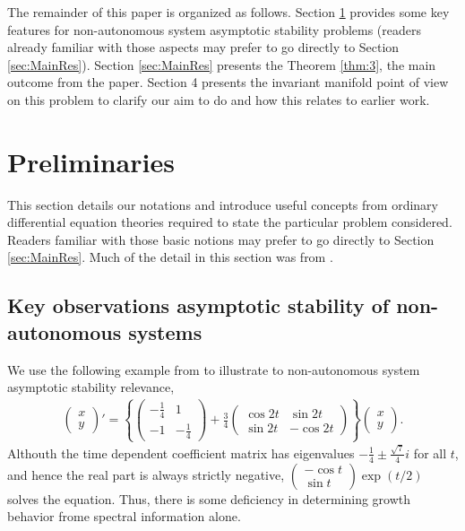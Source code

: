 \documentclass[a4paper,11pt]{article}
\newcounter{Theorem}
\theoremstyle{remark}
\begin{document}
The remainder of this paper is organized as follows. Section \ref{sec:prelim} provides some key features for non-autonomous system asymptotic stability problems (readers already familiar with those  aspects may prefer to go directly to Section \ref{sec:MainRes}). Section \ref{sec:MainRes} presents the Theorem \ref{thm:3}, the main outcome from the paper. Section 4 presents the invariant manifold point of view on this problem to clarify our aim to do and how this relates to earlier work.

\section{Preliminaries} \label{sec:prelim}
This section details our notations and introduce useful concepts from ordinary differential equation theories required to state the particular problem considered. Readers familiar with those basic notions may prefer to go directly to Section \ref{sec:MainRes}. Much of the detail in this section was from \cite{L19}. 

\subsection{Key observations asymptotic stability of non-autonomous systems}
We use the following example from  \cite{MY60} to illustrate to non-autonomous system asymptotic stability relevance,
\begin{align*}
\begin{pmatrix} x\\y \end{pmatrix}' = \left\{\begin{pmatrix} -\frac{1}{4} & 1\\-1 & -\frac{1}{4} \end{pmatrix}+ \frac{3}{4}\begin{pmatrix} \cos 2t & \sin 2t\\ \sin 2t & -\cos 2t \end{pmatrix}\right\} \begin{pmatrix} x\\y \end{pmatrix}.
\end{align*}
Althouth the time dependent coefficient matrix has eigenvalues $-\frac{1}{4} \pm \frac{\sqrt{7}}{4}i$ for all $t$, and hence the real part is always strictly negative, $\begin{pmatrix} -\cos t\\ \sin t \end{pmatrix}\exp(t/2)$ solves the equation. Thus, there is some deficiency in determining growth behavior frome spectral information alone.
\end{document}
